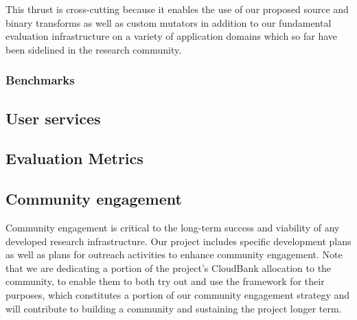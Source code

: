 This thrust is cross-cutting because it enables the use of our proposed source and binary 
transforms as well as custom mutators in addition to our fundamental evaluation infrastructure 
on a variety of application domains which so far have been sidelined in the research community.


\subsubsection{Benchmarks}

\subsection{User services}
\label{sec:user-services}


\subsection{Evaluation Metrics}


\subsection{Community engagement}


Community engagement is critical to the long-term success and viability of any
developed research infrastructure.  Our project includes specific development
plans as well as plans for outreach activities to enhance community engagement.  
Note that we are dedicating a portion of the project's CloudBank allocation to
the community, to enable them to both try out and use the framework for their
purposes, which constitutes a portion of our community engagement strategy and
will contribute to building a community and sustaining the project longer term. 

